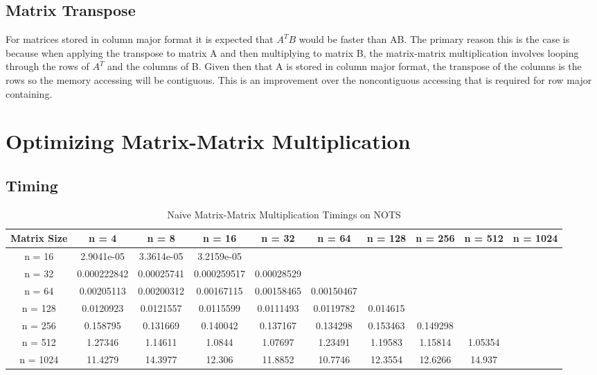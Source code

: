 \documentclass{article}
\begin{document}
\subsection{Matrix Transpose}

For matrices stored in column major format it is expected that $A^{T}B$ would be faster than AB. The primary reason this is the case is because when applying the transpose to matrix A and then multiplying to matrix B, the matrix-matrix multiplication involves looping through the rows of $A^{T}$ and the columns of B. Given then that A is stored in column major format, the transpose of the columns is the rows so the memory accessing will be contiguous. This is an improvement over the noncontiguous accessing that is required for row major containing. 



\section{Optimizing Matrix-Matrix Multiplication}

\subsection{Timing}
\begin{table}[ht!]
    \caption{Naive Matrix-Matrix Multiplication Timings on NOTS}
    \centering
    \begin{tabular}{|c|c|c|c|c|c|c|c|c|c|}
        \hline
        Matrix Size & n = 4 & n = 8 & n = 16 & n = 32 & n = 64 & n = 128 & n = 256 & n = 512 & n = 1024 \\
        \hline
        n = 16 & 2.9041e-05 & 3.3614e-05 & 3.2159e-05 \\
        \hline
        n = 32 & 0.000222842 & 0.00025741 & 0.000259517 & 0.00028529 \\
        \hline
        n = 64 & 0.00205113 & 0.00200312 & 0.00167115 & 0.00158465 & 0.00150467 \\
        \hline
        n = 128 & 0.0120923 & 0.0121557 & 0.0115599 & 0.0111493 & 0.0119782 & 0.014615 \\
        \hline
        n = 256 & 0.158795 & 0.131669 & 0.140042 & 0.137167 & 0.134298 & 0.153463 & 0.149298 \\
        \hline
        n = 512 & 1.27346 & 1.14611 & 1.0844 & 1.07697 & 1.23491 & 1.19583 & 1.15814 & 1.05354 \\
        \hline 
        n = 1024 & 11.4279 & 14.3977 & 12.306 & 11.8852 & 10.7746 & 12.3554 & 12.6266 & 14.937 \\
        \hline
    \end{tabular}
\end{table}
\end{document}
